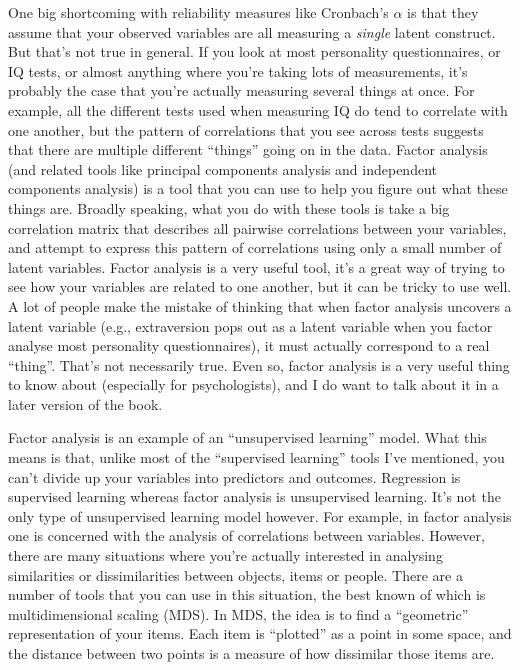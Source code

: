 \begin{itemize}
 One big shortcoming with reliability measures like Cronbach's $\alpha$ is that they assume that your observed variables are all measuring a {\it single} latent construct. But that's not true in general. If you look at most personality questionnaires, or IQ tests, or almost anything where you're taking lots of measurements, it's probably the case that you're actually measuring several things at once. For example, all the different tests used when measuring IQ do tend to correlate with one another, but the pattern of correlations that you see across tests suggests that there are multiple different ``things'' going on in the data. Factor analysis (and related tools like principal components analysis and independent components analysis) is a tool that you can use to help you figure out what these things are. Broadly speaking, what you do with these tools is take a big correlation matrix that describes all pairwise correlations between your variables, and attempt to express this pattern of correlations using only a small number of latent variables. Factor analysis is a very useful tool, it's a great way of trying to see how your variables are related to one another, but it can be tricky to use well. A lot of people make the mistake of thinking that when factor analysis uncovers a latent variable (e.g., extraversion pops out as a latent variable when you factor analyse most personality questionnaires), it must actually correspond to a real ``thing''. That's not necessarily true. Even so, factor analysis is a very useful thing to know about (especially for psychologists), and I do want to talk about it in a later version of the book.

 Factor analysis is an example of an ``unsupervised learning'' model. What this means is that, unlike most of the ``supervised learning'' tools I've mentioned, you can't divide up your variables into predictors and outcomes. Regression is supervised learning whereas factor analysis is unsupervised learning. It's not the only type of unsupervised learning model however. For example, in factor analysis one is concerned with the analysis of correlations between variables. However, there are many situations where you're actually interested in analysing similarities or dissimilarities between objects, items or people. There are a number of tools that you can use in this situation, the best known of which is multidimensional scaling (MDS). In MDS, the idea is to find a ``geometric'' representation of your items. Each item is ``plotted'' as a point in some space, and the distance between two points is a measure of how dissimilar those items are.    


\end{itemize}
